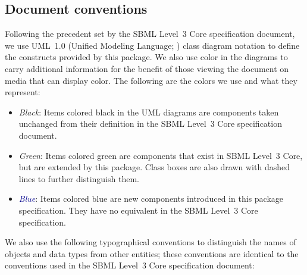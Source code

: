 \subsection{Document conventions}
\label{conventions}

Following the precedent set by the SBML Level~3 Core specification
document, we use UML~1.0 (Unified Modeling Language;
\citealt{eriksson:1998,oestereich:1999}) class diagram notation to
define the constructs provided by this package.  We also use color in
the diagrams to carry additional information for the benefit of those
viewing the document on media that can display color.  The following are
the colors we use and what they represent:

\begin{itemize}

\item[\raisebox{2.75pt}{\colorbox{black}{\rule{0.8pt}{0.8pt}}}]
  \emph{Black}: Items colored black in the UML diagrams are components
  taken unchanged from their definition in the SBML Level~3 Core
  specification document.

\item[\raisebox{2.75pt}{\colorbox{mediumgreen}{\rule{0.8pt}{0.8pt}}}]
  \emph{\textcolor{mediumgreen}{Green}}: Items colored green are
  components that exist in SBML Level~3 Core, but are extended by this
  package.  Class boxes are also drawn with dashed lines to further
  distinguish them.

\item[\raisebox{2.75pt}{\colorbox{darkblue}{\rule{0.8pt}{0.8pt}}}]
  \emph{\textcolor{darkblue}{Blue}}: Items colored blue are new
  components introduced in this package specification.  They have no
  equivalent in the SBML Level~3 Core specification.

\end{itemize}

We also use the following typographical conventions to distinguish the
names of objects and data types from other entities; these conventions
are identical to the conventions used in the SBML Level~3 Core specification
document:

